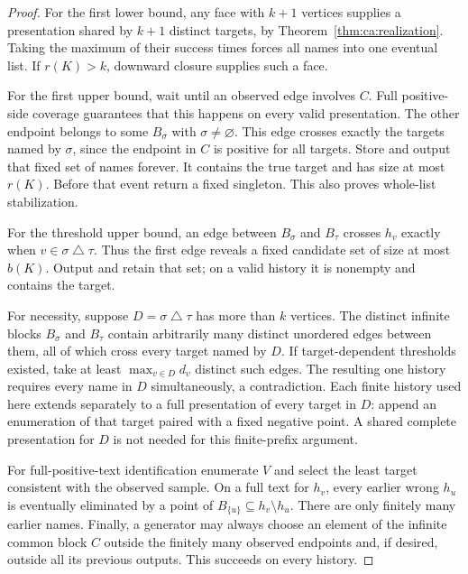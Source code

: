 \begin{proof}
For the first lower bound, any face with $k+1$ vertices supplies a presentation shared by $k+1$ distinct targets, by Theorem~\ref{thm:ca:realization}. Taking the maximum of their success times forces all names into one eventual list. If $r(K)>k$, downward closure supplies such a face.

For the first upper bound, wait until an observed edge involves $C$. Full positive-side coverage guarantees that this happens on every valid presentation. The other endpoint belongs to some $B_\sigma$ with $\sigma\ne\varnothing$. This edge crosses exactly the targets named by $\sigma$, since the endpoint in $C$ is positive for all targets. Store and output that fixed set of names forever. It contains the true target and has size at most $r(K)$. Before that event return a fixed singleton. This also proves whole-list stabilization.

For the threshold upper bound, an edge between $B_\sigma$ and $B_\tau$ crosses $h_v$ exactly when $v\in\sigma\mathbin{\triangle}\tau$. Thus the first edge reveals a fixed candidate set of size at most $b(K)$. Output and retain that set; on a valid history it is nonempty and contains the target.

For necessity, suppose $D=\sigma\mathbin{\triangle}\tau$ has more than $k$ vertices. The distinct infinite blocks $B_\sigma$ and $B_\tau$ contain arbitrarily many distinct unordered edges between them, all of which cross every target named by $D$. If target-dependent thresholds existed, take at least $\max_{v\in D}d_v$ distinct such edges. The resulting one history requires every name in $D$ simultaneously, a contradiction. Each finite history used here extends separately to a full presentation of every target in $D$: append an enumeration of that target paired with a fixed negative point. A shared complete presentation for $D$ is not needed for this finite-prefix argument.

For full-positive-text identification enumerate $V$ and select the least target consistent with the observed sample. On a full text for $h_v$, every earlier wrong $h_u$ is eventually eliminated by a point of $B_{\{u\}}\subseteq h_v\setminus h_u$. There are only finitely many earlier names. Finally, a generator may always choose an element of the infinite common block $C$ outside the finitely many observed endpoints and, if desired, outside all its previous outputs. This succeeds on every history.
\end{proof}

